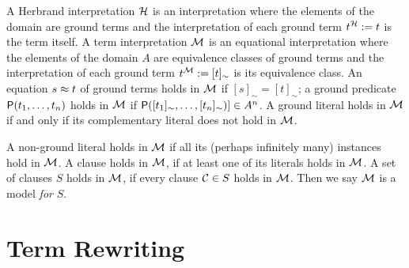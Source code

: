 \begin{definition}\label{def:termmodel}
	A {\myem Herbrand interpretation}  ${\mathcal H}$ is an interpretation where the elements of the domain are ground terms
	and the interpretation of each ground term $t^{\mathcal H} := t$ is the term itself.
	A {\myem term interpretation} ${\mathcal M}$ is an equational interpretation where the elements of the domain $A$ 
	are equivalence classes of ground terms
	and the interpretation of each ground term $t^{\mathcal M} := [t]_\sim$ is its equivalence class.
	An equation $s\approx t$ of ground terms holds in ${\mathcal M}$ if $[s]_\sim=[t]_\sim$;
	a ground predicate ${\mathsf P}(t_1,\ldots,t_n)$ holds in ${\mathcal M}$ if ${\mathsf P}([t_1]_\sim,\ldots,[t_n]_\sim)] \in A^n$.
	A ground literal holds in ${\mathcal M}$ if and only if its complementary literal does not hold in ${\mathcal M}$.
	
	A non-ground literal holds in ${\mathcal M}$ if all its 
	(perhaps infinitely many)
	instances hold in ${\mathcal M}$.
	A clause holds in ${\mathcal M}$, if at least one of its literals holds in ${\mathcal M}$.
	A set of clauses $S$ holds in ${\mathcal M}$, if every clause ${\mathcal C}\in S$ holds in ${\mathcal M}$.
	Then we say ${\mathcal M}$ is a model {\em for} $S$.
	
\end{definition}

\section{Term Rewriting}

